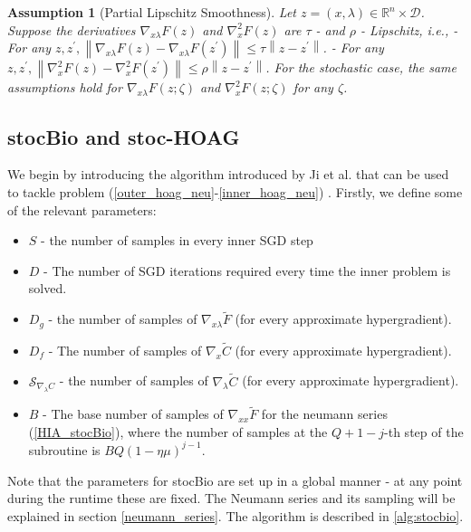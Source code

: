 \documentclass[11pt, twoside]{report}
\newtheorem{assumption}[theorem]{Assumption}
\begin{document}
\begin{assumption}[Partial Lipschitz Smoothness] \label{pls_ass}
Let $z = (x,\lambda) \in \mathbb{R}^{n} \times \mathcal{D}$. Suppose the derivatives $\nabla_{x\lambda} F(z)$ and $\nabla_x^2 F(z)$ are $\tau$ - and $\rho$ - Lipschitz, i.e.,
- For any $z, z^{\prime},\left\|\nabla_{x\lambda} F(z)-\nabla_{x\lambda} F(z^{\prime})\right\| \leq \tau\left\|z-z^{\prime}\right\|$.
- For any $z, z^{\prime},\left\|\nabla_x^2 F(z)-\nabla_x^2 F\left(z^{\prime}\right)\right\| \leq \rho\left\|z-z^{\prime}\right\|$.
For the stochastic case, the same assumptions hold for $\nabla_{x\lambda} F(z; \zeta)$ and $\nabla_x^2 F(z ; \zeta)$ for any $\zeta$.
\end{assumption}

\subsection{stocBio and stoc-HOAG}
We begin by introducing the algorithm introduced by Ji et al. that can be used to tackle problem (\ref{outer_hoag_neu}-\ref{inner_hoag_neu}) \cite{ji2021bilevel}. Firstly, we define some of the relevant parameters:
\begin{itemize}
        \item $S$ - the number of samples in every inner SGD step
        \item $D$ - The number of SGD iterations required every time the inner problem is solved.
        \item $D_g$ - the number of samples of $\nabla_{x\lambda} \tilde{F}$ (for every approximate hypergradient).
        \item $D_f$ - The number of samples of $\nabla_x \tilde{C}$ (for every approximate hypergradient).
        \item $\mathcal{S}_{\nabla_\lambda C}$ - the number of samples of $\nabla_{\lambda} \tilde{C}$ (for every approximate hypergradient).
        \item $B$ - The base number of samples of $\nabla_{xx} \tilde{F}$ for the neumann series (\ref{HIA_stocBio}), where the number of samples at the $Q+1-j$-th step of the subroutine is $BQ(1-\eta\mu)^{j-1}.$
    \end{itemize}
Note that the parameters for stocBio are set up in a global manner - at any point during the runtime these are fixed. The Neumann series and its sampling will be explained in section \ref{neumann_series}. The algorithm is described in \ref{alg:stocbio}.
\end{document}
